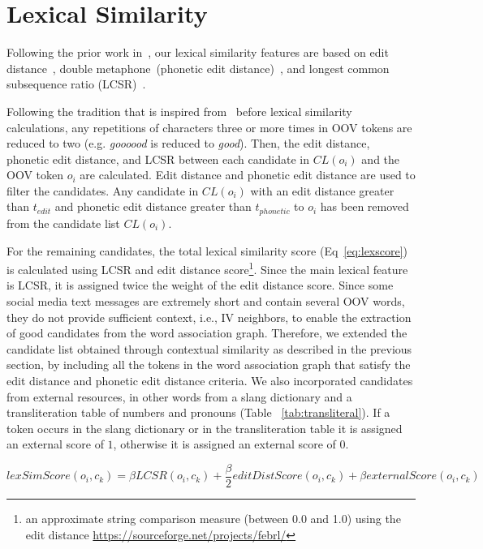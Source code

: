 \documentclass[a4paper,onesided,12pt]{report}
\begin{document}
\section{Lexical Similarity}

Following the prior work in~\cite{Han:2011:LNS:2002472.2002520,DBLP:conf/acl/HassanM13}, our lexical similarity features are based on edit distance~\cite{levenshtein1966bcc}, double metaphone~(phonetic edit distance)~\cite{Philips:2000:DMS:349124.349132}, and longest common subsequence ratio (LCSR)~\cite{Contractor:2010:UCN:1944566.1944588}.

Following the tradition that is inspired from~\cite{Kaufmann2010} before lexical similarity calculations, any repetitions of characters three or more times in OOV tokens are reduced to two (e.g. \emph{goooood} is reduced to \emph{good}). Then, the edit distance, phonetic edit distance, and LCSR between each candidate in $CL(o_{i})$ and the OOV token $o_i$ are calculated. Edit distance and phonetic edit distance are used to filter the candidates. Any candidate in $CL(o_{i})$ with an edit distance greater than $t_{edit}$ and phonetic edit distance greater than $t_{phonetic}$ to $o_i$ has been removed from the candidate list $CL(o_{i})$.

For the remaining candidates, the total lexical similarity score (Eq~\ref{eq:lexscore}) is calculated using LCSR and edit distance score\footnote{an approximate string comparison measure (between 0.0 and 1.0) using the edit distance \url{https://sourceforge.net/projects/febrl/}}. Since the main lexical feature is LCSR, it is assigned twice the weight of the edit distance score. Since some social media text messages are extremely short and contain several OOV words, they do not provide sufficient context, i.e., IV neighbors, to enable the extraction of good candidates from the word association graph. Therefore, we extended the candidate list obtained through contextual similarity as described in the previous section, by including all the tokens in the word association graph that satisfy the edit distance and phonetic edit distance criteria. We also incorporated candidates from external resources, in other words from a slang dictionary and a transliteration table of numbers and pronouns (Table ~\ref{tab:transliteral}). If a token occurs in the slang dictionary or in the transliteration table it is assigned an external score of $1$, otherwise it is assigned an external score of $0$.

\begin{equation}
lexSimScore(o_i,c_k) = \beta LCSR(o_i,c_k) + \frac{\beta} 2 editDistScore(o_i,c_k) + \beta externalScore(o_i,c_k)
\label{eq:lexscore}
\end{equation}
\end{document}
